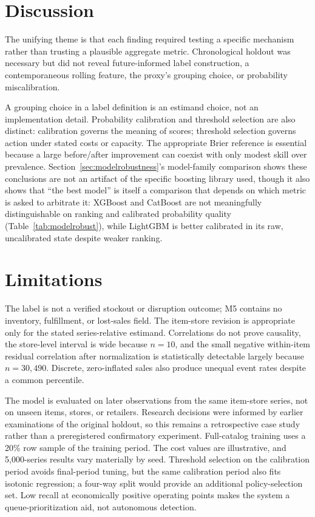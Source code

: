 \documentclass[11pt]{article}
\begin{document}
\section{Discussion}

The unifying theme is that each finding required testing a specific mechanism rather than trusting a plausible aggregate metric. Chronological holdout was necessary but did not reveal future-informed label construction, a contemporaneous rolling feature, the proxy's grouping choice, or probability miscalibration.

A grouping choice in a label definition is an estimand choice, not an implementation detail. Probability calibration and threshold selection are also distinct: calibration governs the meaning of scores; threshold selection governs action under stated costs or capacity. The appropriate Brier reference is essential because a large before/after improvement can coexist with only modest skill over prevalence. Section~\ref{sec:modelrobustness}'s model-family comparison shows these conclusions are not an artifact of the specific boosting library used, though it also shows that ``the best model'' is itself a comparison that depends on which metric is asked to arbitrate it: XGBoost and CatBoost are not meaningfully distinguishable on ranking and calibrated probability quality (Table~\ref{tab:modelrobust}), while LightGBM is better calibrated in its raw, uncalibrated state despite weaker ranking.

\section{Limitations}

The label is not a verified stockout or disruption outcome; M5 contains no inventory, fulfillment, or lost-sales field. The item-store revision is appropriate only for the stated series-relative estimand. Correlations do not prove causality, the store-level interval is wide because $n=10$, and the small negative within-item residual correlation after normalization is statistically detectable largely because $n=30{,}490$. Discrete, zero-inflated sales also produce unequal event rates despite a common percentile.

The model is evaluated on later observations from the same item-store series, not on unseen items, stores, or retailers. Research decisions were informed by earlier examinations of the original holdout, so this remains a retrospective case study rather than a preregistered confirmatory experiment. Full-catalog training uses a 20\% row sample of the training period. The cost values are illustrative, and 5{,}000-series results vary materially by seed. Threshold selection on the calibration period avoids final-period tuning, but the same calibration period also fits isotonic regression; a four-way split would provide an additional policy-selection set. Low recall at economically positive operating points makes the system a queue-prioritization aid, not autonomous detection.
\end{document}
